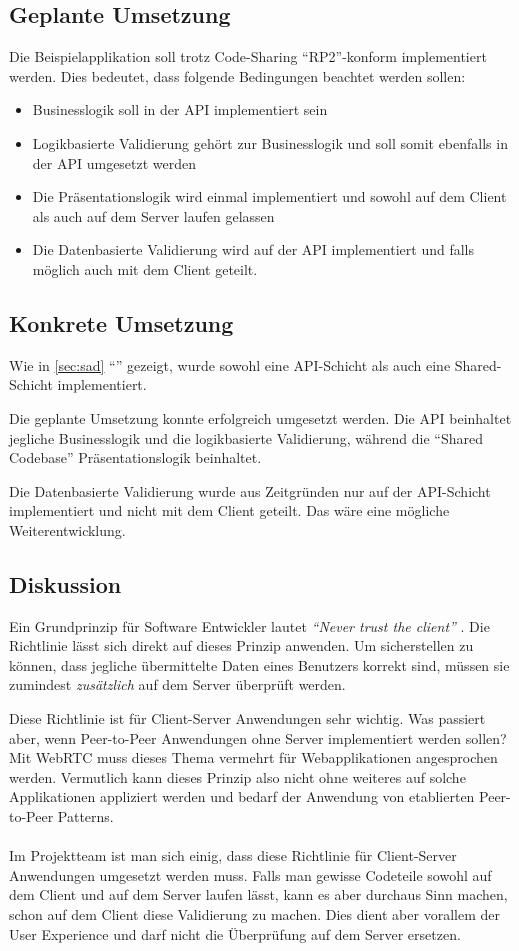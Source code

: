 \subsection*{Geplante Umsetzung}
Die Beispielapplikation soll trotz Code-Sharing ``RP2''-konform implementiert werden. Dies bedeutet, dass folgende Bedingungen beachtet werden sollen:
\begin{itemize}
	\item Businesslogik soll in der API implementiert sein
	\item Logikbasierte Validierung gehört zur Businesslogik und soll somit ebenfalls in der API umgesetzt werden
	\item Die Präsentationslogik wird einmal implementiert und sowohl auf dem Client als auch auf dem Server laufen gelassen
	\item Die Datenbasierte Validierung wird auf der API implementiert und falls möglich auch mit dem Client geteilt.
\end{itemize}

\subsection*{Konkrete Umsetzung}
Wie in \ref{sec:sad} ``'' gezeigt, wurde sowohl eine API-Schicht als auch eine Shared-Schicht implementiert.

Die geplante Umsetzung konnte erfolgreich umgesetzt werden. Die API beinhaltet jegliche Businesslogik und die logikbasierte Validierung, während die ``Shared Codebase'' Präsentationslogik beinhaltet.

Die Datenbasierte Validierung wurde aus Zeitgründen nur auf der API-Schicht implementiert und nicht mit dem Client geteilt. Das wäre eine mögliche Weiterentwicklung.

\subsection*{Diskussion}
Ein Grundprinzip für Software Entwickler lautet \emph{``Never trust the client''} \cite{DefensiveProgramming}. Die Richtlinie lässt sich direkt auf dieses Prinzip anwenden.
Um sicherstellen zu können, dass jegliche übermittelte Daten eines Benutzers korrekt sind, müssen sie zumindest \emph{zusätzlich} auf dem Server überprüft werden.

Diese Richtlinie ist für Client-Server Anwendungen sehr wichtig. Was passiert aber, wenn Peer-to-Peer Anwendungen ohne Server implementiert werden sollen? Mit \mbox{\gls{WebRTC}} \cite{WebRTC} muss dieses Thema vermehrt für Webapplikationen angesprochen werden. Vermutlich kann dieses Prinzip also nicht ohne weiteres auf solche Applikationen appliziert werden und bedarf der Anwendung von etablierten Peer-to-Peer Patterns.
\\ \\
Im Projektteam ist man sich einig, dass diese Richtlinie für Client-Server Anwendungen umgesetzt werden muss. Falls man gewisse Codeteile sowohl auf dem Client und auf dem Server laufen lässt, kann es aber durchaus Sinn machen, schon auf dem Client diese Validierung zu machen. Dies dient aber vorallem der User Experience und darf nicht die Überprüfung auf dem Server ersetzen.